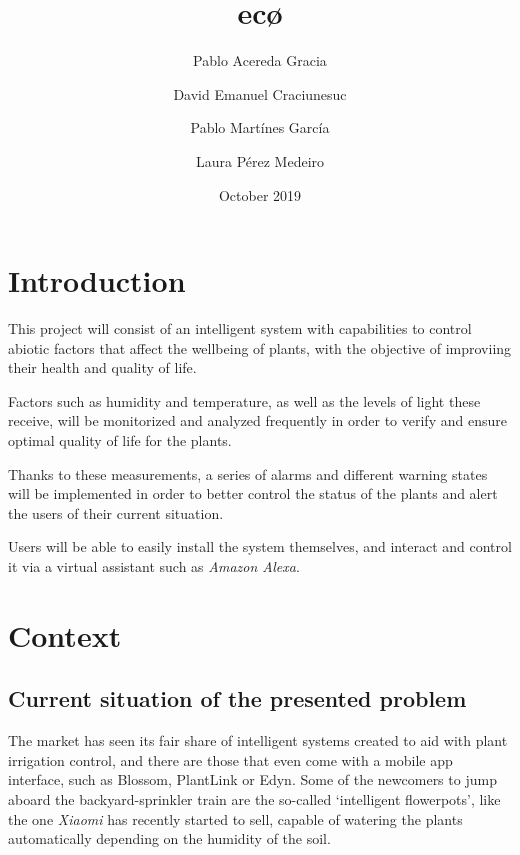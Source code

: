 \documentclass[english,runningheads,a4paper]{llncs}[2018/03/10]
\title{ec\textbf{\o}}
\author{
    Pablo Acereda Gracia \and
    David Emanuel Craciunesuc \and
    Pablo Martínes García \and
    Laura Pérez Medeiro
}
\date{October 2019}
\begin{document}
\maketitle


\section*{Introduction}

This project will consist of an intelligent system with capabilities to control
abiotic factors that affect the wellbeing of plants, with the objective of
improviing their health and quality of life.

Factors such as humidity and temperature, as well as the levels of light these
receive, will be monitorized and analyzed frequently in order to verify and
ensure optimal quality of life for the plants.

Thanks to these measurements, a series of alarms and different warning states
will be implemented in order to better control the status of the plants and
alert the users of their current situation.

Users will be able to easily install the system themselves, and interact and
control it via a virtual assistant such as \textit{Amazon Alexa}.


\section*{Context}


    \subsection*{Current situation of the presented problem}

    The market has seen its fair share of intelligent systems created to aid
    with plant irrigation control, and there are those that even come with a
    mobile app interface, such as Blossom, PlantLink or Edyn. Some of the
    newcomers to jump aboard the backyard-sprinkler train are the so-called
    `intelligent flowerpots', like the one \textit{Xiaomi} has recently started
    to sell, capable of watering the plants automatically depending on the
    humidity of the soil.
\end{document}
